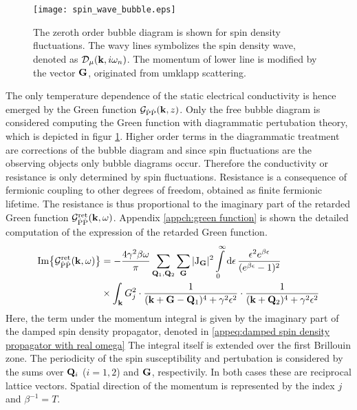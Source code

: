 %
\begin{figure}
	\centering
	\texttt{[image: spin\_wave\_bubble.eps]}
	\caption{
The zeroth order bubble diagram is shown for spin density fluctuations.
The wavy lines symbolizes the spin density wave, denoted as $\mathcal{D}_{\mu}(\vb{k},i\omega_{n})$.
The momentum of lower line is modified by the vector $\vb{G}$, originated from umklapp scattering.
	}
	\label{fig:spin wave bubble}
\end{figure}
%
The only temperature dependence of the static electrical conductivity is hence emerged by the Green function $\mathcal{G}_{\dot{\mathrm{P}}\dot{\mathrm{P}}}(\vb{k}, z)$.
Only the free bubble diagram is considered computing the Green function with diagrammatic pertubation theory, which is depicted in figur \ref{fig:spin wave bubble}.
Higher order terms in the diagrammatic treatment are corrections of the bubble diagram and since spin fluctuations are the observing objects only bubble diagrams occur.
Therefore the conductivity or resistance is only determined by spin fluctuations.
Resistance is a consequence of fermionic coupling to other degrees of freedom, obtained as finite fermionic lifetime.
The resistance is thus proportional to the imaginary part of the retarded Green function $\mathcal{G}_{\dot{\mathrm{P}}\dot{\mathrm{P}}}^{\mathrm{ret}}(\vb{k}, \omega)$.
Appendix \ref{appch:green function} is shown the detailed computation of the expression of the retarded Green function.
%
\begin{align}
	\Im{\mathcal{G}_{\dot{\mathrm{P}}\dot{\mathrm{P}}}^{\mathrm{ret}}(\vb{k}, \omega)} &= 
		-\frac{4 \gamma^{2} \beta \omega}{\pi}
		\sum\limits_{\vb{Q}_{1}, \vb{Q}_{2}}
		\sum\limits_{\vb{G}}
		\vert \mathrm{J}_{\vb{G}} \vert^{2}
		\int\limits_{0}^{\infty} \dd{\epsilon}
		\frac{\epsilon^{2} e^{\beta \epsilon}}{(e^{\beta \epsilon} - 1)^{2}}
		\notag \\
		&\times
		\int_{\vb{k}} G_{j}^{2} \cdot
		\frac{1}{(\vb{k}+\vb{G}-\vb{Q}_{1})^{4} + \gamma^{2} \epsilon^{2}} \cdot
		\frac{1}{(\vb{k} + \vb{Q}_{2})^{4} + \gamma^{2} \epsilon^{2}}
\end{align}
%
Here, the term under the momentum integral is given by the imaginary part of the damped spin density propagator, denoted in \eqref{appeq:damped spin density propagator with real omega}
The integral itself is extended over the first Brillouin zone.
The periodicity of the spin susceptibility and pertubation is considered by the sums over $\vb{Q}_{i}$ ($i=1,2$) and $\vb{G}$, respectivily.
In both cases these are reciprocal lattice vectors.
Spatial direction of the momentum is represented by the index $j$ and $\beta^{-1} = T$.

